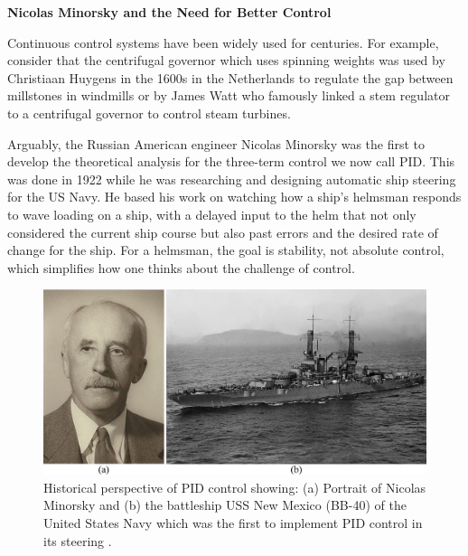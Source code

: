 \documentclass[12pt,letter]{article}
\begin{document}
\begin{review}
	\label{sec:control_systems_review}

		\textbf{Nicolas Minorsky and the Need for Better Control}
	
		\noindent Continuous control systems have been widely used for centuries. For example, consider that the centrifugal governor which uses spinning weights was used by Christiaan Huygens in the 1600s in the Netherlands to regulate the gap between millstones in windmills or by James Watt who famously linked a stem regulator to a centrifugal governor to control steam turbines. 

		Arguably, the Russian American engineer Nicolas Minorsky was the first to develop the theoretical analysis for the three-term control we now call PID. This was done in 1922 while he was researching and designing automatic ship steering for the US Navy. He based his work on watching how a ship's helmsman responds to wave loading on a ship, with a delayed input to the helm that not only considered the current ship course but also past errors and the desired rate of change for the ship. For a helmsman, the goal is stability, not absolute control, which simplifies how one thinks about the challenge of control.
		
	\begin{figure}[H]
		\centering
		\includegraphics[width=6in]{../figures/PID_Nicolas_Minorsky_and_USS_New_Mexico}
		\caption{Historical perspective of PID control showing: (a) Portrait of Nicolas Minorsky \protect\footnotemark[1] and (b) the battleship USS New Mexico (BB-40) of the United States Navy which was the first to implement PID control in its steering \protect\footnotemark[2]. }
		\label{fig:PID_Nicolas_Minorsky_and_USS_New_Mexico}
	\end{figure}

	
\end{review}
\end{document}
